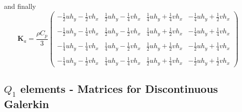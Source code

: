 and finally
\[
\boxed{
{\bm K}_a
=
\frac{\rho C_p}{3}
\left(
\begin{array}{cccc}
-\frac{1}{2} u h_y  -\frac{1}{2} v h_x & 
 \frac{1}{2} u h_y  -\frac{1}{4} v h_x & 
 \frac{1}{4} u h_y  +\frac{1}{4} v h_x & 
-\frac{1}{4} u h_y  +\frac{1}{2} v h_x \\ \\
-\frac{1}{2} u h_y  -\frac{1}{4} v h_x & 
 \frac{1}{2} u h_y  -\frac{1}{2} v h_x & 
 \frac{1}{4} u h_y  +\frac{1}{2} v h_x & 
-\frac{1}{4} u h_y  +\frac{1}{4} v h_x \\ \\
-\frac{1}{4} u h_y  -\frac{1}{4} v h_x & 
 \frac{1}{4} u h_y  -\frac{1}{2} v h_x & 
 \frac{1}{2} u h_y  +\frac{1}{2} v h_x & 
-\frac{1}{2} u h_y  +\frac{1}{4} v h_x \\ \\
-\frac{1}{4} u h_y  -\frac{1}{2} v h_x & 
 \frac{1}{4} u h_y  -\frac{1}{4} v h_x & 
 \frac{1}{2} u h_y  +\frac{1}{4} v h_x & 
-\frac{1}{2} u h_y  +\frac{1}{2} v h_x 
\end{array}
\right)}
\]








\subsection{$Q_1$ elements - Matrices for Discontinuous Galerkin}

